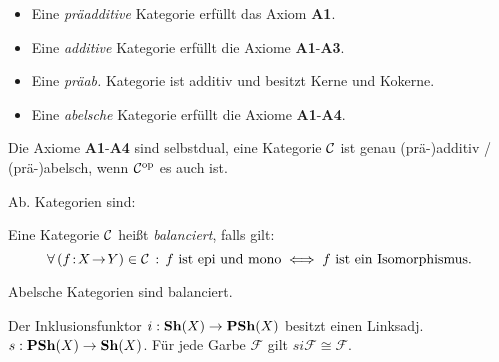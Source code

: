 \documentclass{cheat-sheet}
\newcommand{\Fais}{\mathcal{F}} %
\begin{document}
\begin{defn}
  \begin{itemize}
    \item Eine \emph{präadditive} Kategorie erfüllt das Axiom \textbf{A1}. \\
    \item Eine \emph{additive} Kategorie erfüllt die Axiome \textbf{A1}-\textbf{A3}. \\
    \item Eine \emph{präab.} Kategorie ist additiv und besitzt Kerne und Kokerne.
    \item Eine \emph{abelsche} Kategorie erfüllt die Axiome \textbf{A1}-\textbf{A4}.
  \end{itemize}
\end{defn}

\begin{bem}
  Die Axiome \textbf{A1}-\textbf{A4} sind selbstdual, \dh{} eine Kategorie $\mathcal{C}$ ist genau (prä-)additiv / (prä-)abelsch, wenn $\mathcal{C}^{\mathrm{op}}$ es auch ist.
\end{bem}

\begin{bspe}
  Ab. Kategorien sind: \enspace
  \inlineitem{$\AbGrp$,} \enspace
   \enspace
\end{bspe}

\begin{defn}
  Eine Kategorie $\mathcal{C}$ heißt \emph{balanciert}, falls gilt:
  \[
    \forall \, {(f \!:\! X \!\to\! Y) \in \mathcal{C}} \,:\,
    f \text{ ist epi und mono} \iff f \text{ ist ein Isomorphismus.}
  \]
\end{defn}

\begin{prop}
  Abelsche Kategorien sind balanciert.
\end{prop}


\begin{thm}
  Der Inklusionsfunktor $i : \mathbf{Sh}(X) \to \mathbf{PSh}(X)$ besitzt einen Linksadj. $s : \mathbf{PSh}(X) \to \mathbf{Sh}(X)$. Für jede Garbe $\Fais$ gilt $si \Fais \cong \Fais$.
\end{thm}
\end{document}

